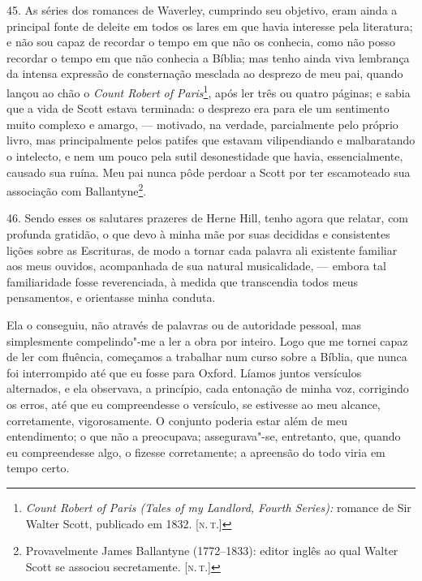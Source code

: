 45. As séries dos romances de Waverley, cumprindo seu objetivo, eram
ainda a principal fonte de deleite em todos os lares em que havia
interesse pela literatura; e não sou capaz de recordar o tempo em que
não os conhecia, como não posso recordar o tempo em que não conhecia a
Bíblia; mas tenho ainda viva lembrança da intensa expressão de
consternação mesclada ao desprezo de meu pai, quando lançou ao chão o
\emph{Count Robert of Paris}\footnote{\emph{Count Robert of Paris (Tales
  of my Landlord, Fourth Series):} romance de Sir Walter Scott,
  publicado em 1832. {[}\textsc{n.\,t.}{]}}, após ler três ou quatro
páginas; e sabia que a vida de Scott estava terminada: o desprezo era
para ele um sentimento muito complexo e amargo, --- motivado, na verdade,
parcialmente pelo próprio livro, mas principalmente pelos patifes que
estavam vilipendiando e malbaratando o intelecto, e nem um pouco pela
sutil desonestidade que havia, essencialmente, causado sua ruína. Meu
pai nunca pôde perdoar a Scott por ter escamoteado sua associação com
Ballantyne\footnote{Provavelmente James Ballantyne (1772--1833): editor
  inglês ao qual Walter Scott se associou secretamente. {[}\textsc{n.\,t.}{]}}.

46. Sendo esses os salutares prazeres de Herne Hill, tenho agora que
relatar, com profunda gratidão, o que devo à minha mãe por suas
decididas e consistentes lições sobre as Escrituras, de modo a tornar
cada palavra ali existente familiar aos meus ouvidos, acompanhada de sua
natural musicalidade, --- embora tal familiaridade fosse reverenciada, à
medida que transcendia todos meus pensamentos, e orientasse minha
conduta.

Ela o conseguiu, não através de palavras ou de autoridade pessoal, mas
simplesmente compelindo"-me a ler a obra por inteiro. Logo que me tornei
capaz de ler com fluência, começamos a trabalhar num curso sobre a
Bíblia, que nunca foi interrompido até que eu fosse para Oxford. Líamos
juntos versículos alternados, e ela observava, a princípio, cada
entonação de minha voz, corrigindo os erros, até que eu compreendesse o
versículo, se estivesse ao meu alcance, corretamente, vigorosamente. O
conjunto poderia estar além de meu entendimento; o que não a preocupava;
assegurava"-se, entretanto, que, quando eu compreendesse algo, o fizesse
corretamente; a apreensão do todo viria em tempo certo.

